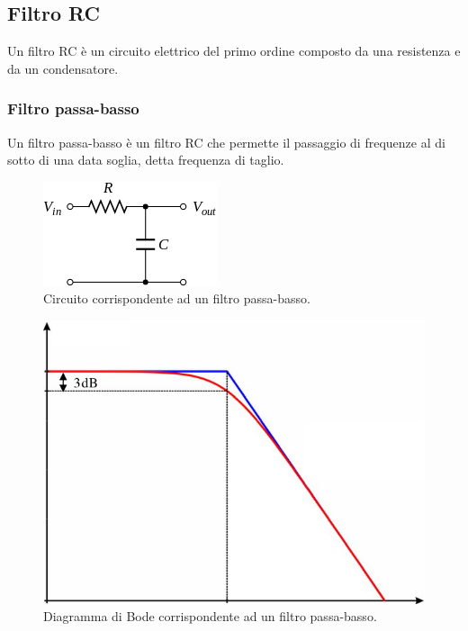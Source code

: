\documentclass{article}
\begin{document}
		\subsection{Filtro RC}
			Un filtro RC è un circuito elettrico del primo ordine composto da una resistenza e da un condensatore.
			\subsubsection{Filtro passa-basso}
				Un filtro passa-basso è un filtro RC che permette il passaggio di frequenze al di sotto di una data soglia, detta frequenza di taglio.
				\begin{figure}[h!]
					\centering
					\includegraphics[scale=0.6]{filtroPassaBasso}
					\caption{Circuito corrispondente ad un filtro passa-basso.}
					\label{fig:filtroPassaBasso}
				\end{figure}
				\newline
				\begin{figure}[h!]
					\centering
					\includegraphics[scale=0.4]{filtroPassaBassoBode}
					\caption{Diagramma di Bode corrispondente ad un filtro passa-basso.}
					\label{fig:filtroPassaBassoBode}
				\end{figure}
\end{document}
